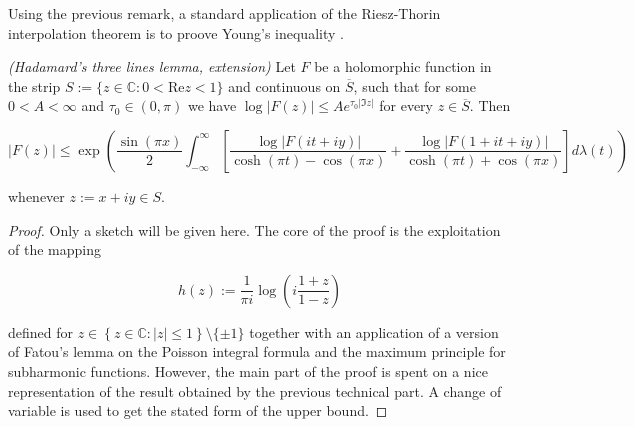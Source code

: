 \begin{remark*}
	Using the previous remark, a standard application of the Riesz-Thorin interpolation theorem is to proove Young's inequality \textup{\cite[22--23]{grafakos:fourier:2014}}.
\end{remark*}

\begin{mdframed}
	\begin{lemma}\emph{(Hadamard's three lines lemma, extension)}
		Let $F$ be a holomorphic function in the strip $S := \{z \in \mathbb{C}: 0 < \mathrm{Re}z < 1\}$ and continuous on $\overline{S}$, such that for some $0 < A < \infty$ and $\tau_0 \in (0,\pi)$ we have $\log \vert F(z)\vert \leqslant A e^{\tau_0 \vert \Im z \vert}$ for every $z \in \overline{S}$. Then

			\begin{equation*}
				\vert F(z) \vert \leqslant \exp\left( \frac{\sin(\pi x)}{2} \int_{-\infty}^\infty \left[ \frac{\log \vert F(it + iy)\vert}{\cosh(\pi t) - \cos(\pi x)} + \frac{\log \vert F(1 + it + iy)\vert}{\cosh(\pi t) + \cos(\pi x)} \right] d\lambda(t)\right)
			\end{equation*}

			whenever $z := x + iy \in S$.
			\label{lem:EHTL}
	\end{lemma}
\end{mdframed}

\begin{proof}
	Only a sketch will be given here. The core of the proof is the exploitation of the mapping

	\begin{equation*}
		h(z) := \frac{1}{\pi i}\log\left( i\frac{1 + z}{1 - z} \right)
	\end{equation*}

	defined for $z \in \left\{ z \in \mathbb{C} : \left| z\right| \leqslant 1\right\} \setminus \{\pm 1\}$ together with an application of a version of Fatou's lemma on the Poisson integral formula and the maximum principle for subharmonic functions. However, the main part of the proof is spent on a nice representation of the result obtained by the previous technical part. A change of variable is used to get the stated form of the upper bound.
\end{proof}

